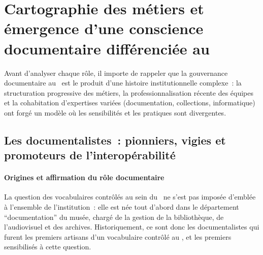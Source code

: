 \section{\label{II-B-1}Cartographie des métiers et émergence d’une conscience documentaire différenciée au \mae}



Avant d’analyser chaque rôle, il importe de rappeler que la gouvernance documentaire au \mae~est le produit d’une histoire institutionnelle complexe~: la structuration progressive des métiers, la professionnalisation récente des équipes et la cohabitation d’expertises variées (documentation, collections, informatique) ont forgé un modèle où les sensibilités et les pratiques sont divergentes.



\subsection{Les documentalistes~: pionniers, vigies et promoteurs de l’interopérabilité}



\paragraph*{Origines et affirmation du rôle documentaire}
La question des vocabulaires contrôlés au sein du \mae~ne s’est pas imposée d’emblée à l’ensemble de l’institution~: elle est née tout d'abord dans le département \enquote{documentation} du musée, chargé de la gestion de la bibliothèque, de l'audiovisuel et des archives. Historiquement, ce sont donc les documentalistes qui furent les premiers artisans d'un vocabulaire contrôlé au \mae, et les premiers sensibilisés à cette question.



